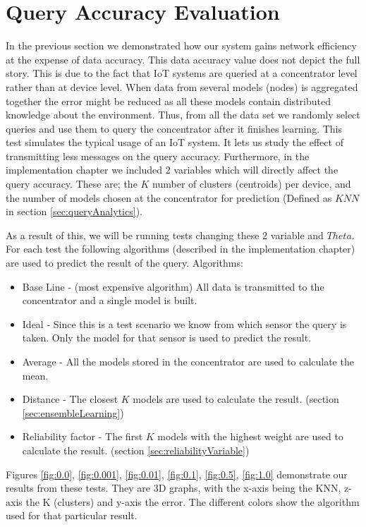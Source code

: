 \documentclass{mproj}
\begin{document}
\section{Query Accuracy Evaluation}

In the previous section we demonstrated how our system gains network efficiency at the expense of data accuracy. This data accuracy value does not depict the full story. This is due to the fact that IoT systems are queried at a concentrator level rather than at device level. When data from several models (nodes) is aggregated together the error might be reduced as all these models contain distributed knowledge about the environment. Thus, from all the data set we randomly select queries and use them to query the concentrator after it finishes learning. This test simulates the typical usage of an IoT system. It lets us study the effect of transmitting less messages on the query accuracy. Furthermore, in the implementation chapter we included 2 variables which will directly affect the query accuracy. These are; the $K$ number of clusters (centroids) per device, and the number of models chosen at the concentrator for prediction (Defined as $KNN$ in section \ref{sec:queryAnalytics}).

As a result of this, we will be running tests changing these 2 variable and $Theta$. For each test the following algorithms (described in the implementation chapter) are used to predict the result of the query. Algorithms:

\begin{itemize}
\item Base Line - (most expensive algorithm) All data is transmitted to the concentrator and a single model is built.
\item Ideal - Since this is a test scenario we know from which sensor the query is taken. Only the model for that sensor is used to predict the result.
\item Average - All the models stored in the concentrator are used to calculate the mean.
\item Distance - The closest $K$ models are used to calculate the result. (section \ref{sec:ensembleLearning})
\item Reliability factor - The first $K$ models with the highest weight are used to calculate the result. (section \ref{sec:reliabilityVariable})
\end{itemize}

Figures \ref{fig:0.0}, \ref{fig:0.001}, \ref{fig:0.01}, \ref{fig:0.1}, \ref{fig:0.5}, \ref{fig:1.0} demonstrate our results from these tests. They are 3D graphs, with the x-axis being the KNN, z-axis the K (clusters) and y-axis the error. The different colors show the algorithm used for that particular result. 
\end{document}
